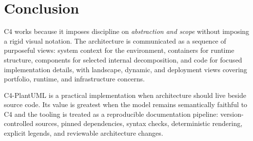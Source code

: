 \documentclass[11pt]{article}
\begin{document}
\section{Conclusion}

C4 works because it imposes discipline on \emph{abstraction and scope} without imposing a rigid visual notation. The architecture is communicated as a sequence of purposeful views: system context for the environment, containers for runtime structure, components for selected internal decomposition, and code for focused implementation details, with landscape, dynamic, and deployment views covering portfolio, runtime, and infrastructure concerns.

C4-PlantUML is a practical implementation when architecture should live beside source code. Its value is greatest when the model remains semantically faithful to C4 and the tooling is treated as a reproducible documentation pipeline: version-controlled sources, pinned dependencies, syntax checks, deterministic rendering, explicit legends, and reviewable architecture changes.
\end{document}
